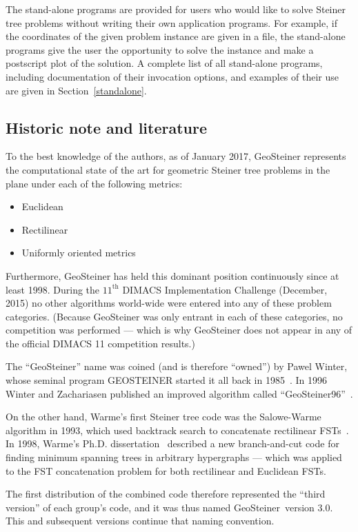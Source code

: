 \documentclass[12pt,twoside,letterpaper]{article}
\def\geosteiner{Geo\-Steiner}
\begin{document}
The stand-alone programs are provided for users who would like to
solve Steiner tree problems without writing their own application
programs. For example, if the coordinates of the given problem
instance are given in a file, the stand-alone programs give the user
the opportunity to solve the instance and make a postscript plot of
the solution. A complete list of all stand-alone programs, including
docu\-mentation of their invocation options, and examples of their use
are given in Section~\ref{standalone}.


\subsection{Historic note and literature}
\label{intro_literature}

To the best knowledge of the authors, as of January 2017, GeoSteiner
represents the computational state of the art for geometric Steiner
tree problems in the plane under each of the following metrics:
\begin{itemize}
 \item Euclidean
 \item Rectilinear
 \item Uniformly oriented metrics
\end{itemize}
Furthermore, GeoSteiner has held this dominant position continuously
since at least 1998.
During the $11^{\mathrm{th}}$ DIMACS Implementation Challenge
(December, 2015) no other algorithms world-wide were entered into any
of these problem categories.
(Because GeoSteiner was only entrant in each of these categories, no
competition was performed --- which is why GeoSteiner does not appear
in any of the official DIMACS 11 competition results.)

The ``GeoSteiner'' name was coined (and is therefore ``owned'') by Pawel
Winter, whose seminal program GEOSTEINER started it all back in
1985~\cite{Winter85}. In 1996 Winter and Zachariasen published an
improved algorithm called ``GeoSteiner96''~\cite{WinterZachariasen97}.

On the other hand, Warme's first Steiner tree code was the Salowe-Warme
algorithm in 1993, which used backtrack search to concatenate
rectilinear FSTs~\cite{SaloweWarme95}.  In 1998, Warme's Ph.D.
dissertation~\cite{Warme98} described a new branch-and-cut code for
finding minimum spanning trees in arbitrary hypergraphs --- which was
applied to the FST concatenation problem for both rectilinear and
Euclidean FSTs. 

The first distribution of the combined code therefore represented the
``third version'' of each group's code, and it was thus named
\geosteiner\ version 3.0. This and subsequent versions continue
that naming convention.
\end{document}
